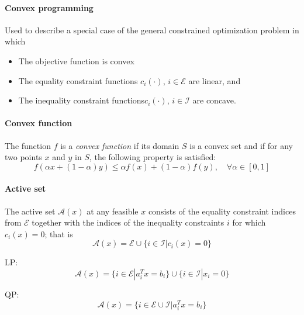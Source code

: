 
\paragraph{Convex programming} Used to describe a special case of the general constrained optimization problem in which
%
\begin{itemize}[nolistsep,noitemsep]
    \item The objective function is convex
    \item The equality constraint functions $c_i(\cdot)$, $i \in \mathcal{E}$ are linear, and
    \item The inequality constraint functions$c_i(\cdot)$, $i \in \mathcal{I}$ are concave.
\end{itemize}

\paragraph{Convex function} The function $f$ is a \textit{convex function} if its domain $S$ is a convex set and if for any two points $x$ and $y$ in $S$, the following property is satisfied:
%
\begin{equation}
    f(\alpha x + (1 - \alpha)y) \leq \alpha f(x) + (1- \alpha) f(y), \quad \forall \alpha \in [0,1]
\end{equation}

\paragraph{Active set} The active set $\mathcal{A}(x)$ at any feasible $x$ consists of the equality constraint indices from $\mathcal{E}$ together with the indices of the inequality constraints $i$ for which $c_i(x)=0$; that is
%
\begin{equation}
    \mathcal{A}(x) = \mathcal{E} \cup \{ i \in \mathcal{I} | c_i(x)=0 \}
\end{equation}

LP:
%
\begin{equation}
    \mathcal{A}(x) = \{ i \in \mathcal{E} |  a_i^Tx=b_i\}\cup \{ i \in \mathcal{I} | x_i = 0 \}
\end{equation}

QP:
%
\begin{equation}
    \mathcal{A}(x) = \{ i \in \mathcal{E} \cup \mathcal{I} | a_i^Tx=b_i \}
\end{equation}

